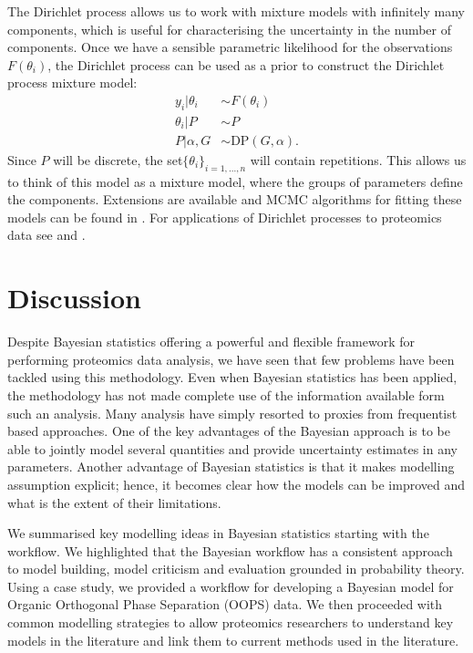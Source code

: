 \documentclass[12pt,english]{article}
\begin{document}
The Dirichlet process allows us to work with mixture models with infinitely many components, which is useful for characterising the uncertainty in the number of components. Once we have a sensible parametric likelihood for the observations $F(\theta_i)$, the Dirichlet process can be used as a prior to construct the Dirichlet process mixture model:
\begin{equation}
\begin{split}
y_i|\theta_i &\sim F(\theta_i)\\
\theta_i|P &\sim P \\
P|\alpha, G & \sim \text{DP}(G, \alpha).
\end{split}
\end{equation}
Since $P$ will be discrete, the set$\{\theta_i\}_{i = 1,...,n}$ will contain repetitions. This allows us to think of this model as a mixture model, where the groups of parameters define the components. Extensions are available \citep{Teh::2006, Rodriguez::2008} and MCMC algorithms for fitting these models can be found in \citet{Neal::2000}. For applications of Dirichlet processes to proteomics data see \citet{Claassen::2009} and \citet{Choi::2010}.

\section{Discussion}
Despite Bayesian statistics offering a powerful and flexible framework for performing proteomics data analysis, we have seen that few problems have been tackled using this methodology. Even when Bayesian statistics has been applied, the methodology has not made complete use of the information available form such an analysis. Many analysis have simply resorted to proxies from frequentist based approaches. One of the key advantages of the Bayesian approach is to be able to jointly model several quantities and provide uncertainty estimates in any parameters. Another advantage of Bayesian statistics is that it makes modelling assumption explicit; hence, it becomes clear how the models can be improved and what is the extent of their limitations.

We summarised key modelling ideas in Bayesian statistics starting with the workflow. We highlighted that the Bayesian workflow has a consistent approach to model building, model criticism and evaluation grounded in probability theory. Using a case study, we provided a workflow for developing a Bayesian model for Organic Orthogonal Phase Separation (OOPS) data. We then proceeded with common modelling strategies to allow proteomics researchers to understand key models in the literature and link them to current methods used in the literature.
\end{document}

